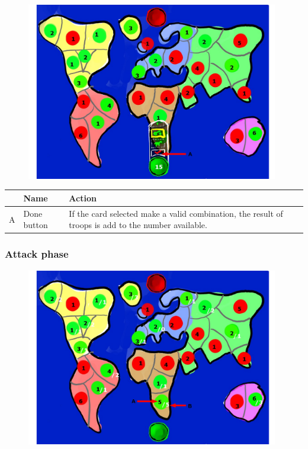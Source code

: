 \documentclass[12pt,a4paper]{article}
\begin{document}
\begin{figure}[H]
  \centering
  \includegraphics[width=11cm]{pic/mocks/5-2.pdf}
\end{figure}

\begin{table}[H]
\small
\centering
\begin{tabular}{c|p{5cm}|p{7cm}}
& Name & Action \\ \hline\hline
A
&Done button
&If the card selected make a valid combination, the result of troops is add to the number available.
\end{tabular}
\end{table}

\subsubsection{Attack phase}\label{mock:753}

\begin{figure}[H]
  \centering
  \includegraphics[width=11cm]{pic/mocks/5-3.pdf}
\end{figure}
\end{document}
